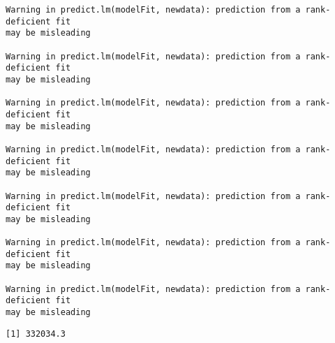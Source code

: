 \documentclass[
  letterpaper,
  DIV=11,
  numbers=noendperiod]{scrartcl}
\begin{document}
\begin{verbatim}
Warning in predict.lm(modelFit, newdata): prediction from a rank-deficient fit
may be misleading

Warning in predict.lm(modelFit, newdata): prediction from a rank-deficient fit
may be misleading

Warning in predict.lm(modelFit, newdata): prediction from a rank-deficient fit
may be misleading

Warning in predict.lm(modelFit, newdata): prediction from a rank-deficient fit
may be misleading

Warning in predict.lm(modelFit, newdata): prediction from a rank-deficient fit
may be misleading

Warning in predict.lm(modelFit, newdata): prediction from a rank-deficient fit
may be misleading

Warning in predict.lm(modelFit, newdata): prediction from a rank-deficient fit
may be misleading
\end{verbatim}

\begin{verbatim}
[1] 332034.3
\end{verbatim}
\end{document}
